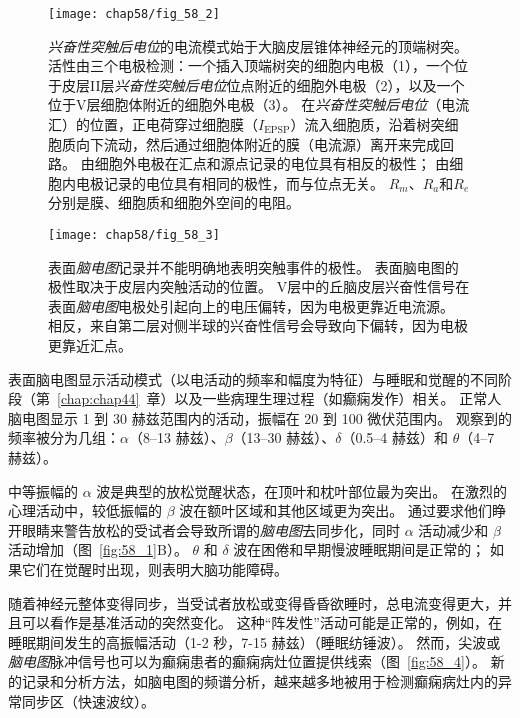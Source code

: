 \begin{figure}[htbp]
	\centering
	\texttt{[image: chap58/fig\_58\_2]}
	\caption{\textit{兴奋性突触后电位}的电流模式始于大脑皮层锥体神经元的顶端树突。
		活性由三个电极检测：一个插入顶端树突的细胞内电极（1），一个位于皮层II层\textit{兴奋性突触后电位}位点附近的细胞外电极（2），以及一个位于V层细胞体附近的细胞外电极（3）。
		在\textit{兴奋性突触后电位}（电流汇）的位置，正电荷穿过细胞膜（$ I_{\text{EPSP}} $）流入细胞质，沿着树突细胞质向下流动，然后通过细胞体附近的膜（电流源）离开来完成回路。
		由细胞外电极在汇点和源点记录的电位具有相反的极性；
		由细胞内电极记录的电位具有相同的极性，而与位点无关。
		$ R_m $、$ R_a $和$ R_e $分别是膜、细胞质和细胞外空间的电阻。}
	\label{fig:58_2}
\end{figure}


\begin{figure}[htbp]
	\centering
	\texttt{[image: chap58/fig\_58\_3]}
	\caption{表面\textit{脑电图}记录并不能明确地表明突触事件的极性。
		表面脑电图的极性取决于皮层内突触活动的位置。
		V层中的丘脑皮层兴奋性信号在表面\textit{脑电图}电极处引起向上的电压偏转，因为电极更靠近电流源。
		相反，来自第二层对侧半球的兴奋性信号会导致向下偏转，因为电极更靠近汇点。}
	\label{fig:58_3}
\end{figure}


表面脑电图显示活动模式（以电活动的频率和幅度为特征）与睡眠和觉醒的不同阶段（第~\ref{chap:chap44}~章）以及一些病理生理过程（如癫痫发作）相关。
正常人脑电图显示 1 到 30 赫兹范围内的活动，振幅在 20 到 100 微伏范围内。
观察到的频率被分为几组：$\alpha$（8–13 赫兹）、$ \beta $（13–30 赫兹）、$ \delta $（0.5–4 赫兹）和 $ \theta $（4–7 赫兹）。


中等振幅的 $ \alpha $ 波是典型的放松觉醒状态，在顶叶和枕叶部位最为突出。
在激烈的心理活动中，较低振幅的 $ \beta $ 波在额叶区域和其他区域更为突出。
通过要求他们睁开眼睛来警告放松的受试者会导致所谓的\textit{脑电图}去同步化，同时 $\alpha$ 活动减少和 $ \beta $ 活动增加（图~\ref{fig:58_1}B）。
$ \theta $ 和 $ \delta $ 波在困倦和早期慢波睡眠期间是正常的；
如果它们在觉醒时出现，则表明大脑功能障碍。


随着神经元整体变得同步，当受试者放松或变得昏昏欲睡时，总电流变得更大，并且可以看作是基准活动的突然变化。
这种“阵发性”活动可能是正常的，例如，在睡眠期间发生的高振幅活动（1-2 秒，7-15 赫兹）（睡眠纺锤波）。
然而，尖波或\textit{脑电图}脉冲信号也可以为癫痫患者的癫痫病灶位置提供线索（图~\ref{fig:58_4}）。
新的记录和分析方法，如脑电图的频谱分析，越来越多地被用于检测癫痫病灶内的异常同步区（快速波纹）。


